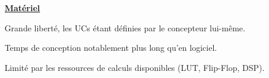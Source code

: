 \documentclass[../main.tex]{subfiles}
\begin{document}
\begin{frame}
\begin{columns}
\begin{column}{.5\linewidth}
    \end{column}
    \begin{column}{.5\linewidth}
      \begin{overlayarea}{\linewidth}{.85\textheight}
        \centering
        \textbf{\large \underline{\phantom{g}Matériel\phantom{g}}} \vspace{.25 em}

        \begin{ctrlitemize}{.25 em}
          \item Grande liberté, les UCs étant définies par le concepteur lui-même.
          \item Temps de conception notablement plus long qu'en logiciel.
          \item Limité par les ressources de calculs disponibles (LUT, Flip-Flop, DSP).
        \end{ctrlitemize}


\end{overlayarea}
\end{column}
\end{columns}
\end{frame}
\end{document}
